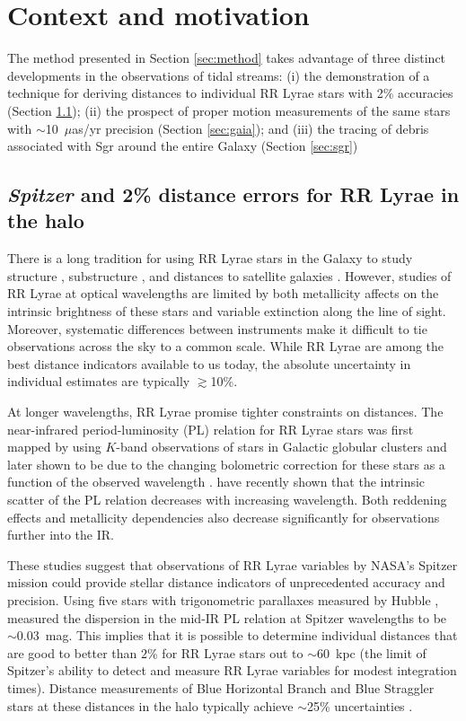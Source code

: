 \documentclass[preprint]{aastex}
\begin{document}
\section{Context and motivation} \label{sec:context}
The method presented in Section \ref{sec:method} takes advantage of
three distinct developments in the observations of tidal streams: (i)
the demonstration of a technique for deriving distances to individual
RR Lyrae stars with 2\% accuracies (Section \ref{sec:spitzer}); (ii)
the prospect of proper motion measurements of the same stars with
$\sim$10~$\mu$as/yr precision (Section \ref{sec:gaia}); and (iii) the
tracing of debris associated with Sgr around the entire Galaxy
(Section \ref{sec:sgr})

\subsection{{\it Spitzer} and 2\% distance errors for RR Lyrae in the halo}
\label{sec:spitzer}

There is a long tradition for using RR Lyrae stars in the Galaxy to
study structure \citep[going back to first estimates of the distance
  to the Galactic center][]{shapley18}, substructure
\citep[e.g.][]{sesar10}, and distances to satellite galaxies
\citep[e.g.][]{clementini03}.  However, studies of RR Lyrae at optical
wavelengths are limited by both metallicity affects on the intrinsic
brightness of these stars and variable extinction along the line of
sight.  Moreover, systematic differences between instruments make it
difficult to tie observations across the sky to a common scale. While
RR Lyrae are among the best distance indicators available to us today,
the absolute uncertainty in individual estimates are typically
$\gtrsim$10\%.

At longer wavelengths, RR Lyrae promise tighter constraints on
distances.  The near-infrared period-luminosity (PL) relation for RR
Lyrae stars was first mapped by \citet{longmore86} using $K$-band
observations of stars in Galactic globular clusters and later shown to
be due to the changing bolometric correction for these stars as a
function of the observed wavelength \citep{catelan04}.
\citet{madore12} have recently shown that the intrinsic scatter of the
PL relation decreases with increasing wavelength. Both reddening
effects and metallicity dependencies also decrease significantly for
observations further into the IR.

These studies suggest that observations of RR Lyrae variables by
NASA's Spitzer mission could provide stellar distance indicators of
unprecedented accuracy and precision.  Using five stars with
trigonometric parallaxes measured by Hubble \citep{benedict11},
\citet{madore12} measured the dispersion in the mid-IR PL relation at
Spitzer wavelengths to be $\sim$0.03~mag. This implies that it is
possible to determine individual distances that are good to better
than $2\%$ for RR Lyrae stars out to $\sim$60~kpc (the limit of
Spitzer's ability to detect and measure RR Lyrae variables for modest
integration times). Distance measurements of Blue Horizontal Branch
and Blue Straggler stars at these distances in the halo typically
achieve $\sim$25\% uncertainties \citep[e.g.,][]{deason12b}.
\end{document}
